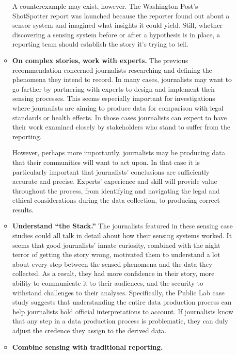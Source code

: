 \begin{itemize}
\begin{itemized}
\begin{itemize}
A counterexample may exist, however. The Washington Post's ShotSpotter
report was launched because the reporter found out about a sensor system
and imagined what insights it could yield. Still, whether discovering a sensing
system before or after a hypothesis is in place, a reporting team should
establish the story it's trying to tell.

\item \textbf{On complex stories, work with experts.}
The previous recommendation concerned journalists researching and defining
the phenomena they intend to record. In many cases, journalists may
want to go farther by partnering with experts to design and implement their
sensing processes. This seems especially important for investigations where
journalists are aiming to produce data for comparison with legal standards
or health effects. In those cases journalists can expect to have their work
examined closely by stakeholders who stand to suffer from the reporting.

However, perhaps more importantly, journalists may be producing data
that their communities will want to act upon. In that case it is particularly
important that journalists' conclusions are sufficiently accurate and precise.
Experts' experience and skill will provide value throughout the process,
from identifying and navigating the legal and ethical considerations during
the data collection, to producing correct results.

\item \textbf{Understand ``the Stack.''}
The journalists featured in these sensing case studies could all talk in detail
about how their sensing systems worked. It seems that good journalists'
innate curiosity, combined with the night terror of getting the story wrong,
motivated them to understand a lot about every step between the sensed
phenomena and the data they collected. As a result, they had more confidence
in their story, more ability to communicate it to their audiences,
and the security to withstand challenges to their analyses. Specifically, the
Public Lab case study suggests that understanding the entire data production
process can help journalists hold official interpretations to account. If
journalists know that any step in a data production process is problematic,
they can duly adjust the credence they assign to the derived data.

\item \textbf{Combine sensing with traditional reporting.}


\end{itemize}
\end{itemized}
\end{itemize}
